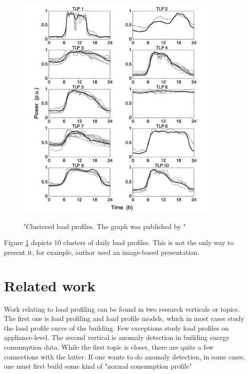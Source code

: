 \documentclass[
11pt, %
english, %
singlespacing, %
headsepline, %
]{MastersDoctoralThesis} %
\begin{document}
\begin{figure}[H]
	\centering
	\caption{"Clustered load profiles. The graph was published by \protect\cite{GERBEC2005}"}
	\includegraphics[width=0.9\textwidth]{Figures/clustered_profiles.png}
	\label{fig:profiles}
\end{figure}

Figure \ref{fig:profiles} depicts 10 clusters of daily load profiles. 
This is not the only way to present it, for example, author \cite{Park2019} used an image-based presentation.


\chapter{Related work}

Work relating to load profiling can be found in two research verticals or topics. The first one is load profiling and load profile models, which in 
most cases study the load profile curve of the building. Few exceptions study load profiles on appliance-level.
The second vertical is anomaly detection in building energy consumption data. While the first topic is closer, there are quite a few connections with the latter. 
If one wants to do anomaly detection, in some cases, one must first build some kind of "normal consumption profile" 
\end{document}

